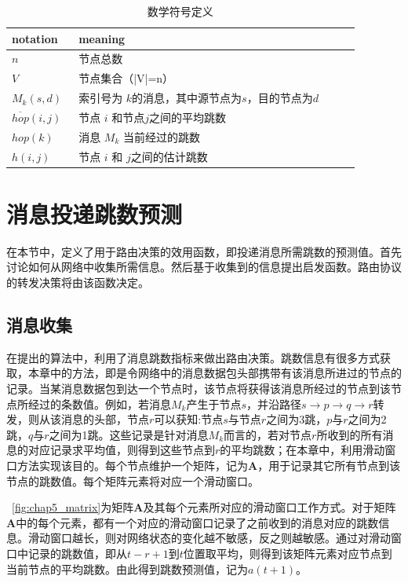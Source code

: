 \begin{table}[tbp]
  \caption{数学符号定义}
  \label{tab:chap5_math_table}
\centering
  \begin{tabular}{p{0.15\linewidth}<{\centering}p{0.73\linewidth}<{\centering}}
  \hline
   \textbf{notation} & \textbf{meaning}  \\
    \hline
    $n$ & 节点总数\\ 
    $V$ & 节点集合（|V|=n）\\ 
    $M_k(s,d)$ & 索引号为 $k$的消息，其中源节点为$s$，目的节点为$d$\\   
    $\overline{hop}(i,j)$ & 节点 $i$ 和节点$j$之间的平均跳数 \\ 
    $hop(k)$ & 消息 $M_k$ 当前经过的跳数\\
    $h(i,j)$ & 节点 $i$ 和 $j$之间的估计跳数 \\
    \hline
  \end{tabular}
\end{table}


\section{消息投递跳数预测}
\label{chap5:消息投递跳数预测}

在本节中，定义了用于路由决策的效用函数，即投递消息所需跳数的预测值。首先讨论如何从网络中收集所需信息。然后基于收集到的信息提出启发函数。路由协议的转发决策将由该函数决定。

\subsection{消息收集}
\label{chap5:消息收集}

在提出的算法中，利用了消息跳数指标来做出路由决策。跳数信息有很多方式获取，本章中的方法，即是令网络中的消息数据包头部携带有该消息所进过的节点的记录。当某消息数据包到达一个节点时，该节点将获得该消息所经过的节点到该节点所经过的条数值。例如，若消息$M_k$产生于节点$s$，并沿路径$s\rightarrow p\rightarrow q\rightarrow r$转发，则从该消息的头部，节点$r$可以获知:节点$s$与节点$r$之间为3跳，$p$与$r$之间为2跳，$q$与$r$之间为1跳。这些记录是针对消息$M_k$而言的，若对节点$r$所收到的所有消息的对应记录求平均值，则得到这些节点到$r$的平均跳数；在本章中，利用滑动窗口方法实现该目的。每个节点维护一个矩阵，记为$\bm{A}$，用于记录其它所有节点到该节点的跳数值。每个矩阵元素将对应一个滑动窗口。

\figurename~\ref{fig:chap5_matrix}为矩阵$\bm{A}$及其每个元素所对应的滑动窗口工作方式。对于矩阵$\bm{A}$中的每个元素，都有一个对应的滑动窗口记录了之前收到的消息对应的跳数信息。滑动窗口越长，则对网络状态的变化越不敏感，反之则越敏感。通过对滑动窗口中记录的跳数值，即从$t-r+1$到$t$位置取平均，则得到该矩阵元素对应节点到当前节点的平均跳数。由此得到跳数预测值，记为$a(t+1)$。


